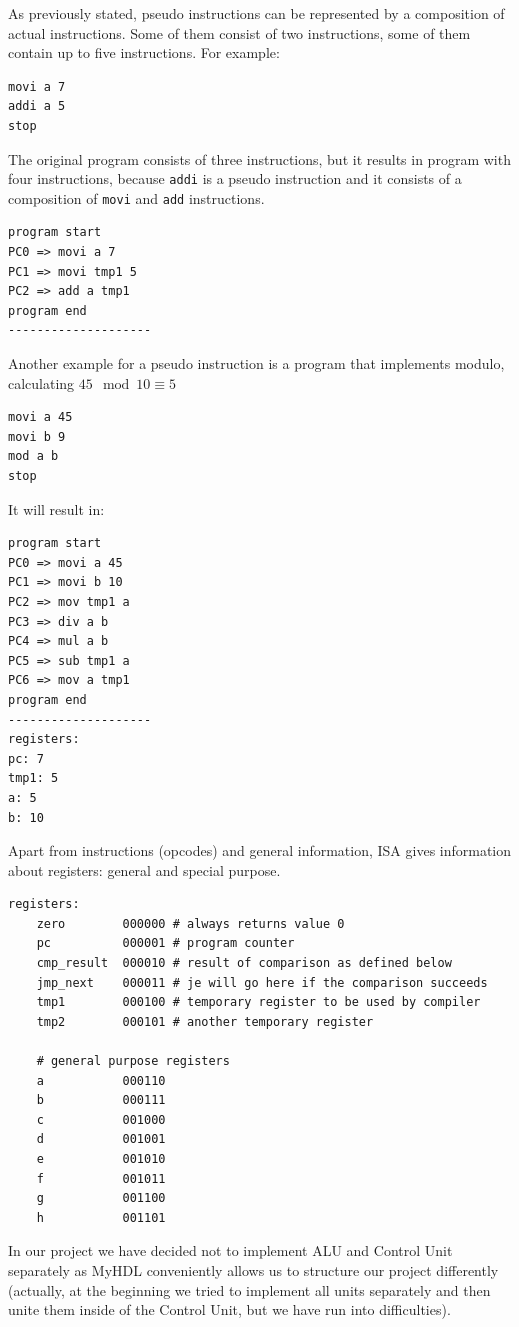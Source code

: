 \documentclass[12pt,a4paper]{scrartcl}
\begin{document}
As previously stated, pseudo instructions can be represented by a composition of actual instructions. Some of them consist of two instructions, some of them contain up to five instructions. For example:
\begin{verbatim}
movi a 7
addi a 5
stop
\end{verbatim}
The original program consists of three instructions, but it results in program with four instructions, because \texttt{addi} is a pseudo instruction and it consists of a composition of \texttt{movi} and \texttt{add} instructions.
\begin{verbatim}
program start
PC0 => movi a 7
PC1 => movi tmp1 5
PC2 => add a tmp1
program end
--------------------
\end{verbatim}
Another example for a pseudo instruction is a program that implements modulo, calculating \(45 \mod 10 \equiv 5\)
\begin{verbatim}
movi a 45
movi b 9
mod a b
stop
\end{verbatim}
It will result in:
\begin{verbatim}
program start
PC0 => movi a 45
PC1 => movi b 10
PC2 => mov tmp1 a
PC3 => div a b
PC4 => mul a b
PC5 => sub tmp1 a
PC6 => mov a tmp1
program end
--------------------
registers:
pc: 7
tmp1: 5
a: 5
b: 10
\end{verbatim}
Apart from instructions (opcodes) and general information, ISA gives information about registers: general and special purpose.
\newpage
\begin{verbatim}
registers:
    zero 		000000 # always returns value 0
    pc			000001 # program counter
    cmp_result  000010 # result of comparison as defined below
    jmp_next    000011 # je will go here if the comparison succeeds
    tmp1        000100 # temporary register to be used by compiler
    tmp2		000101 # another temporary register

    # general purpose registers
    a           000110
    b           000111
    c      	    001000
    d           001001
    e           001010
    f           001011
    g           001100
    h           001101
\end{verbatim}

In our project we have decided not to implement ALU and Control Unit separately as MyHDL conveniently allows us to structure our project differently (actually, at the beginning we tried to implement all units separately and then unite them inside of the Control Unit, but we have run into difficulties).\\
\end{document}
